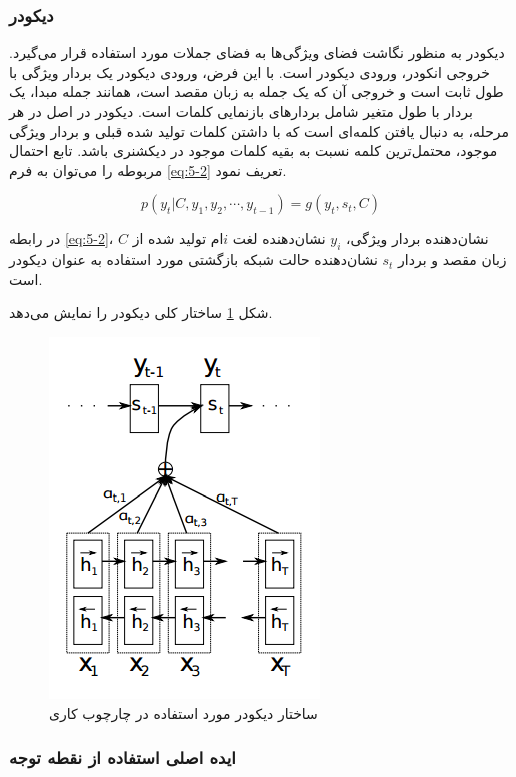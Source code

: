 \subsubsection{دیکودر}

 دیکودر به منظور نگاشت فضای ویژگی‌ها به فضای جملات مورد استفاده قرار می‌گیرد. خروجی انکودر، ورودی دیکودر است. با این فرض، ورودی دیکودر یک بردار ویژگی با طول ثابت است و خروجی آن که یک جمله به زبان مقصد است، همانند جمله مبدا، یک بردار با طول متغیر شامل بردارهای بازنمایی کلمات است. دیکودر در اصل در هر مرحله، به دنبال یافتن کلمه‌ای است که با داشتن کلمات تولید شده قبلی و بردار ویژگی موجود، محتمل‌ترین کلمه نسبت به بقیه کلمات موجود در دیکشنری باشد. تابع احتمال مربوطه را می‌توان به فرم \eqref{eq:5-2} تعریف نمود.
 
 \begin{equation}
 p(y_t | C, y_1, y_2, \cdots, y_{t-1}) = g(y_t, s_t, C)
 \label{eq:5-2}
 \end{equation}

در رابطه \eqref{eq:5-2}، $C$ نشان‌دهنده بردار ویژگی‌، $y_i$ نشان‌دهنده لغت $i$ام تولید شده از زبان مقصد و بردار $s_t$ نشان‌دهنده حالت شبکه بازگشتی مورد استفاده به عنوان دیکودر است.


 شکل \ref{fig:decoder} ساختار کلی دیکودر را نمایش می‌دهد.

\begin{figure}[h]
\centering
\includegraphics[scale=0.7]{Imgs/5-decoder.png}
\caption{ساختار دیکودر مورد استفاده در چارچوب کاری \cite{bahdanau2014neural}}
\label{fig:decoder}
\end{figure}

\subsubsection{ایده اصلی استفاده از نقطه توجه}

